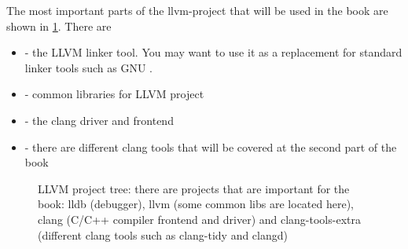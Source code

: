 The most important parts of the llvm-project that will be used in the book are
shown in 
\cref{fig:llvm_tree}. There are
\begin{itemize}
\item {} - the LLVM linker tool. You may want to use it as a
  replacement for standard linker tools such as GNU . 
\item {} - common libraries for LLVM project
\item {} - the clang driver and frontend
\item {} - there are different clang tools that will be
  covered at the second part of the book
\end{itemize}
\begin{figure}[H]
  \begin{center}
  \end{center}
  \caption{LLVM project tree: there are projects that are important for the
    book: lldb (\lldb debugger), llvm (some common libs are located here), clang (C/C++
    compiler frontend and driver) and clang-tools-extra (different clang tools
    such as clang-tidy and clangd)}
  \label{fig:llvm_tree}
\end{figure}

